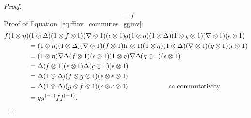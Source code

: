 \begin{proof}
\begin{align*}
    &=f.
  \end{align*}
  Proof of Equation~\ref{eq:ffinv_commutes_gginv}:
  \begin{align*}
    f(1\otimes\eta)&(1\otimes\Delta)(1\otimes f\otimes1)(\nabla\otimes1)(\epsilon\otimes1)g(1\otimes\eta)(1\otimes\Delta)(1\otimes g\otimes1)
      (\nabla\otimes1)(\epsilon\otimes1)\\
    &=(1\otimes\eta)(1\otimes\Delta)(\nabla\otimes1)(f\otimes1)(\epsilon\otimes1)(1\otimes\eta)(1\otimes\Delta)(\nabla\otimes1)(g\otimes1)
      (\epsilon\otimes1)\\
    &=(1\otimes\eta)\nabla\Delta(f\otimes1)(\epsilon\otimes1)(1\otimes\eta)\nabla\Delta(g\otimes1)(\epsilon\otimes1)\\
    &=\Delta(f\otimes1)(\epsilon\otimes1)\Delta(g\otimes1)(\epsilon\otimes1)\\
    &=\Delta(1\otimes\Delta)(f\otimes g\otimes1)(\epsilon\otimes\epsilon\otimes1)\\
    &=\Delta(1\otimes\Delta)(g\otimes f\otimes1)(\epsilon\otimes\epsilon\otimes1)\qquad\qquad\qquad\text{co-commutativity}\\
    &=g{g}^{(-1)}f{f}^{(-1)}.
  \end{align*}

\end{proof}


